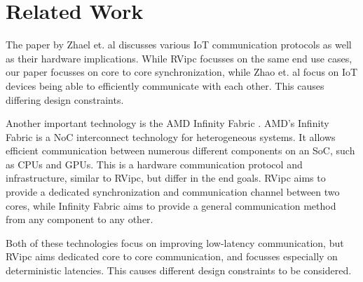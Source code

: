 \section{Related Work}
\label{sec:related_work}

The paper by Zhael et. al \cite{Zhao:IoTCommProtocols:2018} discusses various IoT communication protocols as well as their hardware implications. While RVipc focusses on the same end use cases, our paper focusses on core to core synchronization, while Zhao et. al focus on IoT devices being able to efficiently communicate with each other. This causes differing design constraints.

Another important technology is the AMD Infinity Fabric \cite{AMD:CDNA3:WhitePaper}. AMD's Infinity Fabric is a NoC interconnect technology for heterogeneous systems. It allows efficient communication between numerous different components on an SoC, such as CPUs and GPUs. This is a hardware communication protocol and infrastructure, similar to RVipc, but differ in the end goals. RVipc aims to provide a dedicated synchronization and communication channel between two cores, while Infinity Fabric aims to provide a general communication method from any component to any other.

Both of these technologies focus on improving low-latency communication, but RVipc aims dedicated core to core communication, and focusses especially on deterministic latencies. This causes different design constraints to be considered.
